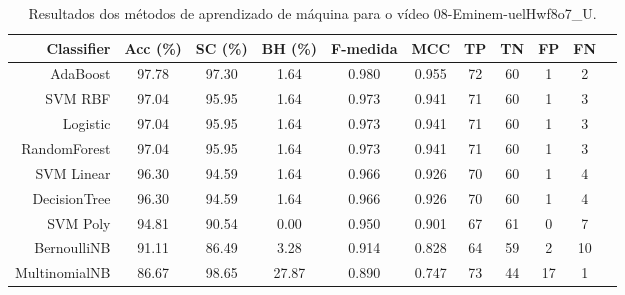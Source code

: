 \begin{table}[!htb]
\centering
\caption{Resultados dos métodos de aprendizado de máquina para o vídeo 08-Eminem-uelHwf8o7_U.}
\label{tab:08-Eminem-uelHwf8o7_U}
\begin{tabular}{r|c|c|c|c|c|c|c|c|c|c}
\hline\hline
Classifier & Acc (\%) & SC (\%) & BH (\%) & F-medida & MCC & TP & TN & FP & FN \\ \hline
AdaBoost & 97.78 & 97.30 & 1.64 & 0.980 & 0.955 & 72 & 60 & 1 & 2 \\ 
SVM RBF & 97.04 & 95.95 & 1.64 & 0.973 & 0.941 & 71 & 60 & 1 & 3 \\ 
Logistic & 97.04 & 95.95 & 1.64 & 0.973 & 0.941 & 71 & 60 & 1 & 3 \\ 
RandomForest & 97.04 & 95.95 & 1.64 & 0.973 & 0.941 & 71 & 60 & 1 & 3 \\ 
SVM Linear & 96.30 & 94.59 & 1.64 & 0.966 & 0.926 & 70 & 60 & 1 & 4 \\ 
DecisionTree & 96.30 & 94.59 & 1.64 & 0.966 & 0.926 & 70 & 60 & 1 & 4 \\ 
SVM Poly & 94.81 & 90.54 & 0.00 & 0.950 & 0.901 & 67 & 61 & 0 & 7 \\ 
BernoulliNB & 91.11 & 86.49 & 3.28 & 0.914 & 0.828 & 64 & 59 & 2 & 10 \\ 
MultinomialNB & 86.67 & 98.65 & 27.87 & 0.890 & 0.747 & 73 & 44 & 17 & 1 \\ 
\hline\hline
\end{tabular}
\end{table}
